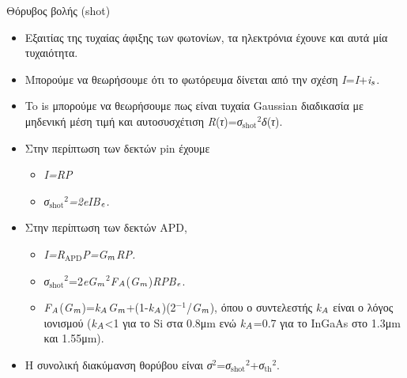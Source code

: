 \documentclass[11pt,aspectratio=169]{beamer}
\begin{document}
\begin{frame}[shrink=20,t]{Θόρυβος βολής (shot)}
\begin{itemize}
\item Εξαιτίας της τυχαίας άφιξης των φωτονίων, τα ηλεκτρόνια έχουνε και αυτά μία τυχαιότητα.
\item Μπορούμε να θεωρήσουμε ότι το φωτόρευμα δίνεται από την σχέση \textit{Ι}=\textit{Ι}+\textit{i}$_{\text{\textit{s}}}$.
\item To is μπορούμε να θεωρήσουμε πως είναι τυχαία Gaussian διαδικασία με μηδενική μέση τιμή και αυτοσυσχέτιση \textit{R}(\textit{τ})=\textit{σ}$_{\text{shot}}$$^{\text{2}}$\textit{δ}(\textit{τ}).
\item Στην περίπτωση των δεκτών pin έχουμε
\begin{itemize}
\item \textit{Ι}\textit{=RP}
\item \textit{σ}$_{\text{shot}}$$^{\text{2}}$\textit{=2e}\textit{Ι}\textit{B}$_{\text{\textit{e}}}$\textit{.}
\end{itemize}
\item Στην περίπτωση των δεκτών APD,
\begin{itemize}
\item \textit{Ι}\textit{=R}$_{\text{APD}}$\textit{P=}\textit{G}$_{\text{\textit{m}}}$\textit{RP}\textit{.}
\item \textit{σ}$_{\text{shot}}$$^{\text{2}}$=2\textit{eG}$_{\text{\textit{m}}}$$^{\text{2}}$\textit{F}$_{\text{\textit{A}}}$(\textit{G}$_{\text{\textit{m}}}$)\textit{RPB}$_{\text{\textit{e}}}$.
\item \textit{F}$_{\text{\textit{A}}}$(\textit{G}$_{\text{\textit{m}}}$)=\textit{k}$_{\text{\textit{A}}}$\textit{G}$_{\text{\textit{m}}}$+(1-\textit{k}$_{\text{\textit{A}}}$)(2$^{-1}$/\textit{G}$_{\text{\textit{m}}}$), όπου ο συντελεστής \textit{k}$_{\text{\textit{A}}}$ είναι ο λόγος ιονισμού (\textit{k}$_{\text{\textit{A}}}$<1 για το Si στα 0.8μm ενώ \textit{k}$_{\text{\textit{A}}}$=0.7 για το InGaAs στο 1.3μm και 1.55μm).
\end{itemize}
\item Η συνολική διακύμανση θορύβου είναι \textit{σ}$^{\text{2}}$=\textit{σ}$_{\text{shot}}$$^{\text{2}}$+\textit{σ}$_{\text{th}}$$^{\text{2}}$.
\end{itemize}
\end{frame}
\end{document}
